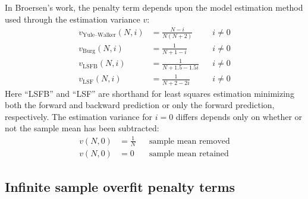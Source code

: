 \documentclass[12pt,letterpaper]{article}
\begin{document}
In Broersen's work, the penalty term depends upon the model estimation
method used through the estimation variance $v$:
\begin{subequations}
\label{eq:v1}
\begin{align}
    v_\text{Yule--Walker}\!\left(N,i\right) &= \frac{N-i}{N\left(N+2\right)}
    &
    &i \neq 0
    \\
    v_\text{Burg}\!\left(N,i\right) &= \frac{1}{N + 1 - i}
    &
    &i \neq 0
    \\
    v_\text{LSFB}\!\left(N,i\right) &= \frac{1}{N + 1.5 - 1.5i}
    &
    &i \neq 0
    \\
    v_\text{LSF}\!\left(N,i\right)  &= \frac{1}{N + 2 - 2i}
    &
    &i \neq 0
\end{align}
\end{subequations}
Here ``LSFB'' and ``LSF'' are shorthand for least squares estimation minimizing
both the forward and backward prediction or only the forward prediction,
respectively.  The estimation variance for $i=0$ differs depends only on
whether or not the sample mean has been subtracted:
\begin{subequations}
\label{eq:v0}
\begin{align}
    v\!\left(N,0\right) &= \frac{1}{N}
    &
    &\text{sample mean removed}
    \\
    v\!\left(N,0\right) &= 0
    &
    &\text{sample mean retained}
\end{align}
\end{subequations}

\subsection*{Infinite sample overfit penalty terms}
\end{document}
